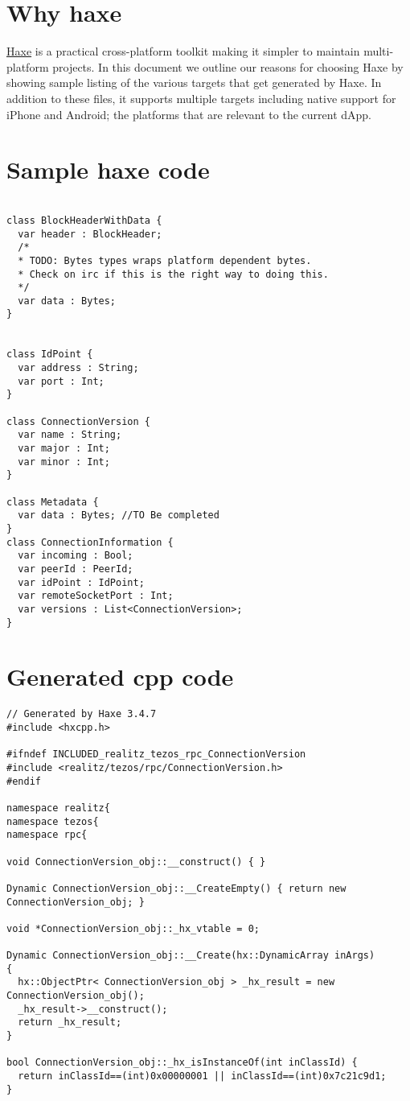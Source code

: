 \documentclass{article}
\begin{document}
\section{Why haxe}
\href{http://haxe.org}{Haxe} is a practical cross-platform toolkit making it simpler to maintain multi-platform projects. In this document we outline our reasons for choosing Haxe by showing sample listing of the various targets that get generated by Haxe. In addition to these files, it supports multiple targets including native support for iPhone and Android; the platforms that are relevant to the current dApp. 
\
\section{Sample haxe code} 
\begin{lstlisting}
  
class BlockHeaderWithData {
  var header : BlockHeader; 
  /* 
  * TODO: Bytes types wraps platform dependent bytes. 
  * Check on irc if this is the right way to doing this.
  */ 
  var data : Bytes;
}


class IdPoint {
  var address : String;
  var port : Int;
}

class ConnectionVersion {
  var name : String;
  var major : Int;
  var minor : Int;
}

class Metadata {
  var data : Bytes; //TO Be completed
}
class ConnectionInformation {
  var incoming : Bool;
  var peerId : PeerId;
  var idPoint : IdPoint;
  var remoteSocketPort : Int;
  var versions : List<ConnectionVersion>;
}
\end{lstlisting}
\section{Generated cpp code}
\begin{lstlisting}
// Generated by Haxe 3.4.7
#include <hxcpp.h>

#ifndef INCLUDED_realitz_tezos_rpc_ConnectionVersion
#include <realitz/tezos/rpc/ConnectionVersion.h>
#endif

namespace realitz{
namespace tezos{
namespace rpc{

void ConnectionVersion_obj::__construct() { }

Dynamic ConnectionVersion_obj::__CreateEmpty() { return new ConnectionVersion_obj; }

void *ConnectionVersion_obj::_hx_vtable = 0;

Dynamic ConnectionVersion_obj::__Create(hx::DynamicArray inArgs)
{
  hx::ObjectPtr< ConnectionVersion_obj > _hx_result = new ConnectionVersion_obj();
  _hx_result->__construct();
  return _hx_result;
}

bool ConnectionVersion_obj::_hx_isInstanceOf(int inClassId) {
  return inClassId==(int)0x00000001 || inClassId==(int)0x7c21c9d1;
}

\end{lstlisting}
\end{document}
